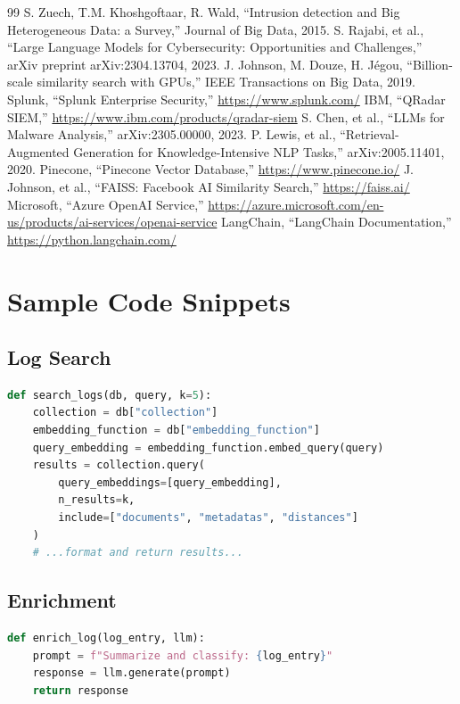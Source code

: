 \documentclass{article}
\begin{document}
\begin{thebibliography}{99}
 S. Zuech, T.M. Khoshgoftaar, R. Wald, ``Intrusion detection and Big Heterogeneous Data: a Survey,'' Journal of Big Data, 2015.
 S. Rajabi, et al., ``Large Language Models for Cybersecurity: Opportunities and Challenges,'' arXiv preprint arXiv:2304.13704, 2023.
 J. Johnson, M. Douze, H. Jégou, ``Billion-scale similarity search with GPUs,'' IEEE Transactions on Big Data, 2019.
 Splunk, ``Splunk Enterprise Security,'' \url{https://www.splunk.com/}
 IBM, ``QRadar SIEM,'' \url{https://www.ibm.com/products/qradar-siem}
 S. Chen, et al., ``LLMs for Malware Analysis,'' arXiv:2305.00000, 2023.
 P. Lewis, et al., ``Retrieval-Augmented Generation for Knowledge-Intensive NLP Tasks,'' arXiv:2005.11401, 2020.
 Pinecone, ``Pinecone Vector Database,'' \url{https://www.pinecone.io/}
 J. Johnson, et al., ``FAISS: Facebook AI Similarity Search,'' \url{https://faiss.ai/}
 Microsoft, ``Azure OpenAI Service,'' \url{https://azure.microsoft.com/en-us/products/ai-services/openai-service}
 LangChain, ``LangChain Documentation,'' \url{https://python.langchain.com/}
\end{thebibliography}

\appendix
\section{Sample Code Snippets}
\subsection{Log Search}
\begin{lstlisting}[language=Python]
def search_logs(db, query, k=5):
    collection = db["collection"]
    embedding_function = db["embedding_function"]
    query_embedding = embedding_function.embed_query(query)
    results = collection.query(
        query_embeddings=[query_embedding],
        n_results=k,
        include=["documents", "metadatas", "distances"]
    )
    # ...format and return results...
\end{lstlisting}

\subsection{Enrichment}
\begin{lstlisting}[language=Python]
def enrich_log(log_entry, llm):
    prompt = f"Summarize and classify: {log_entry}"
    response = llm.generate(prompt)
    return response
\end{lstlisting}
\end{document}
